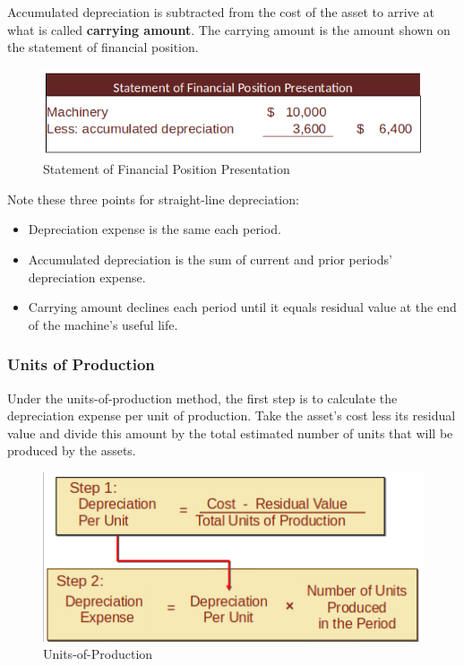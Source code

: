 \documentclass[../main.tex]{subfiles}
\begin{document}
	Accumulated depreciation is subtracted from the cost of the asset to arrive 
	at what is called \textbf{carrying amount}. The carrying amount is the 
	amount shown on the statement of financial position.

	\begin{figure}[ht!]
		\centering		
		\includegraphics[width=.8\columnwidth]{images/c8/straight_line_fp_eg.png}
		\caption{Statement of Financial Position Presentation}
	\end{figure}
	
	Note these three points for straight-line depreciation:
	\begin{itemize}[noitemsep]
		\item Depreciation expense is the same each period.
		\item Accumulated depreciation is the sum of current and prior periods’ 
		depreciation expense.
		\item Carrying amount declines each period until it equals residual 
		value at the end of the machine’s useful life.
	\end{itemize}
	
	\subsubsection{Units of Production}
	Under the units-of-production method, the first step is to calculate the 
	depreciation expense per unit of production. Take the asset’s cost less its 
	residual value and divide this amount by the total estimated number of 
	units that will be produced by the assets.
	
	\begin{figure}[ht!]
		\centering		
		\includegraphics[width=.8\columnwidth]{images/c8/depreciation_uop.png}
		\caption{Units-of-Production}
	\end{figure}
\end{document}
